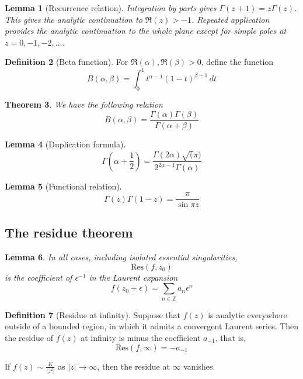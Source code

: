 \documentclass[10pt, oneside, reqno]{amsart}
\theoremstyle{plain}%
\newtheorem{thm}{Theorem}[section]
\newtheorem{lem}[thm]{Lemma}
\theoremstyle{definition}
\newtheorem{defn}[thm]{Definition}
\theoremstyle{remark}
\newcommand{\res}[2]{\text{Res}(#1,#2)}
\newcommand{\Z}{\mathbb{Z}}
\begin{document}
\begin{lem}[Recurrence relation]
	Integration by parts gives $\Gamma(z+1) = z \Gamma(z)$. This gives the analytic continuation to $\Re(z) > -1$.  Repeated application provides the analytic continuation to the whole plane except for simple poles at $z = 0, -1, -2, \dots$.
\end{lem}


\begin{defn}[Beta function]
	For $\Re(\alpha), \Re(\beta) > 0$, define the function \[
		B(\alpha, \beta) = \int_0^1 t^{\alpha - 1} (1-t)^{\beta - 1} \, dt
	\]
\end{defn}

\begin{thm}
We have the following relation
\[ B(\alpha, \beta) = \frac{\Gamma(\alpha) \Gamma(\beta)}{\Gamma(\alpha + \beta)}
\]
\end{thm}

\begin{lem}[Duplication formula]
	\[
		\Gamma(\alpha + \frac{1}{2}) = \frac{\Gamma(2\alpha) \sqrt(\pi)}{2^{2\alpha - 1} \Gamma(\alpha)}
	\]
\end{lem}

\begin{lem}[Functional relation]
	\[
		\Gamma(z) \Gamma(1-z) = \frac{\pi}{\sin \pi z}
	\]
\end{lem}




\subsection{The residue theorem} %
\label{sec:the_residue_theorem}


\begin{lem}
	In all cases, including isolated essential singularities, \[
		\res{f}{z_0}
	\] is the coefficient of $\epsilon^{-1}$ in the Laurent expansion \[
		f(z_0 + \epsilon) = \sum_{n \in \Z} a_n \epsilon^n
	\]
\end{lem}

\begin{defn}[Residue at infinity]
	Suppose that $f(z)$ is analytic everywhere outside of a bounded region, in which it admits a convergent Laurent series.  Then the residue of $f(z)$ at infinity is minus the coefficient $a_{-1}$, that is,\[
		\res{f}{\infty} = -a_{-1}
	\]
	
	If $f(z) \sim \frac{K}{|z^2|}$ as $|z| \rightarrow \infty$, then the residue at $\infty$ vanishes.
\end{defn}
\end{document}
